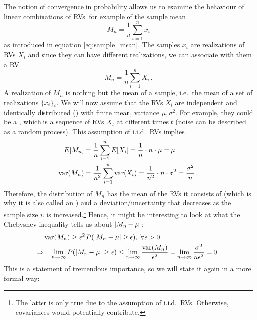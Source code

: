 The notion of convergence in probability allows us to examine the behaviour of linear combinations of RVs, for example of the sample mean
\begin{equation*}
M_n = \frac{1}{n} \sum_{i = 1}^n x_i
\end{equation*}
as introduced in equation \eqref{eq:sample_mean}. The samples $x_i$ are realizations of RVs $X_i$ and since they can have different realizations, we can associate with them a RV
\begin{equation}
M_n = \frac{1}{n} \sum_{i = 1}^n X_i \, .
\end{equation}
A realization of $M_n$ is nothing but the mean of a sample, i.e.~the mean of a set of realizations $\qty{x_i}_i$. We will now assume that the RVs $X_i$ are independent and identically distributed () with finite mean, variance $\mu, \sigma^2$. For example, they could be a , which is a sequence of RVs $X_t$ at different times $t$ (noise can be described as a random process). This assumption of i.i.d.~RVs implies
\begin{align}
E[M_n] &= \frac{1}{n} \sum_{i = 1}^n E[X_i] = \frac{1}{n} \cdot n \cdot \mu = \mu
\\
\operatorname{var}(M_n) &= \frac{1}{n^2} \sum_{i = 1}^n \operatorname{var}(X_i) = \frac{1}{n^2} \cdot n \cdot \sigma^2 = \frac{\sigma^2}{n} \, .
\end{align}
Therefore, the distribution of $M_n$ has the mean of the RVs it consists of (which is why it is also called an ) and a deviation/uncertainty that decreases as the sample size $n$ is increased.\footnote{The latter is only true due to the assumption of i.i.d.~RVs. Otherwise, covariances would potentially contribute.} Hence, it might be interesting to look at what the Chebyshev inequality tells us about $\abs{M_n - \mu}$:
\begin{align}
&\operatorname{var}(M_n) \geq \epsilon^2 \, P\qty(\abs{M_n - \mu} \geq \epsilon), \; \forall \epsilon > 0
\notag\\
\Rightarrow & \quad \lim_{n \rightarrow \infty} P\qty(\abs{M_n - \mu} \geq \epsilon) \leq \lim_{n \rightarrow \infty} \frac{\operatorname{var}(M_n)}{\epsilon^2} = \lim_{n \rightarrow \infty} \frac{\sigma^2}{n \epsilon^2} = 0 \, .
\end{align}
This is a statement of tremendous importance, so we will state it again in a more formal way:
